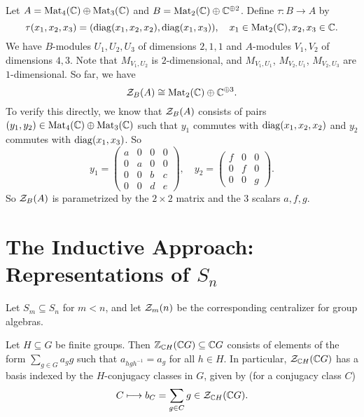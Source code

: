 \begin{example}
  Let $A = \operatorname{Mat}_4(\mathbb{C}) \oplus \operatorname{Mat}_3(\mathbb{C})$
  and $B = \operatorname{Mat}_2(\mathbb{C}) \oplus \mathbb{C}^{\oplus 2}$.
  Define $\tau : B \to A$ by
  \[
    \tau(x_1, x_2, x_3)
    = (\operatorname{diag}(x_1, x_2, x_2), \operatorname{diag}(x_1, x_3)), \quad
    x_1 \in \operatorname{Mat}_2(\mathbb{C}), x_2, x_3 \in \mathbb{C}.
  \]
  We have $B$-modules
  $U_1, U_2, U_3$ of dimensions
  $2, 1, 1$ and $A$-modules
  $V_1, V_2$ of dimensions $4, 3$. Note
  that $M_{V_1, U_2}$ is $2$-dimensional,
  and $M_{V_1, U_1}$, $M_{V_2, U_1}$,
  $M_{V_2, U_3}$ are $1$-dimensional.
  So far, we have
  \[
    \mathcal{Z}_B(A) \cong \operatorname{Mat}_2(\mathbb{C}) \oplus \mathbb{C}^{\oplus 3}.
  \]
  To verify this directly, we know that
  $\mathcal{Z}_B(A)$ consists of pairs
  $(y_1, y_2) \in \operatorname{Mat}_4(\mathbb{C}) \oplus \operatorname{Mat}_3(\mathbb{C})$
  such that $y_1$ commutes with
  $\operatorname{diag}(x_1, x_2, x_2)$ and $y_2$
  commutes with $\operatorname{diag}(x_1, x_3)$. So
  \[
    y_1 =
    \begin{pmatrix}
      a & 0 & 0 & 0 \\
      0 & a & 0 & 0 \\
      0 & 0 & b & c \\
      0 & 0 & d & e
    \end{pmatrix}, \quad
    y_2 =
    \begin{pmatrix}
      f & 0 & 0 \\
      0 & f & 0 \\
      0 & 0 & g
    \end{pmatrix}.
  \]
  So $\mathcal{Z}_B(A)$ is parametrized by the
  $2 \times 2$ matrix and the $3$ scalars
  $a, f, g$.
\end{example}

\section{The Inductive Approach: Representations of \texorpdfstring{$S_n$}{Sn}}

\begin{remark}
  Let $S_m \subseteq S_n$ for
  $m < n$, and let
  $\mathcal{Z}_m(n)$ be the corresponding
  centralizer for group algebras.
\end{remark}

\begin{lemma}
  Let $H \subseteq G$ be finite groups.
  Then $\mathbb{Z}_{\mathbb{C} H}(\mathbb{C} G) \subseteq \mathbb{C} G$
  consists of elements of the form
  $\sum_{g \in G} a_g g$ such that
  $a_{h g h^{-1}} = a_g$ for all
  $h \in H$. In particular,
  $\mathcal{Z}_{\mathbb{C} H}(\mathbb{C} G)$ has a basis indexed
  by the $H$-conjugacy classes in $G$,
  given by (for a conjugacy class $C$)
  \[
    C \longmapsto b_C =
    \sum_{g \in C} g \in \mathcal{Z}_{\mathbb{C} H}(\mathbb{C} G).
  \]
\end{lemma}

